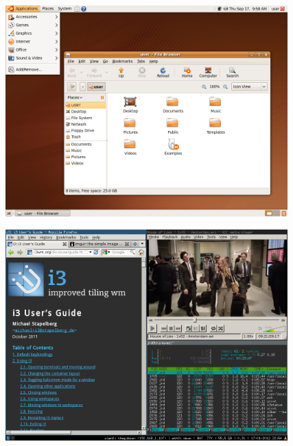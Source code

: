 \documentclass[xetex,serif,compress]{beamer}
\begin{document}
\begin{frame}{}
    \begin{figure}
    \includegraphics[width=0.97\textwidth]{Ubuntu_Linux_Jaunty_screenshot.png}
    \end{figure}
\end{frame}


\begin{frame}{}
\begin{center}
    \begin{figure}
    \includegraphics[width=0.97\textwidth]{TdilE.jpg}
    \end{figure}
\end{center}
\end{frame}
\end{document}
